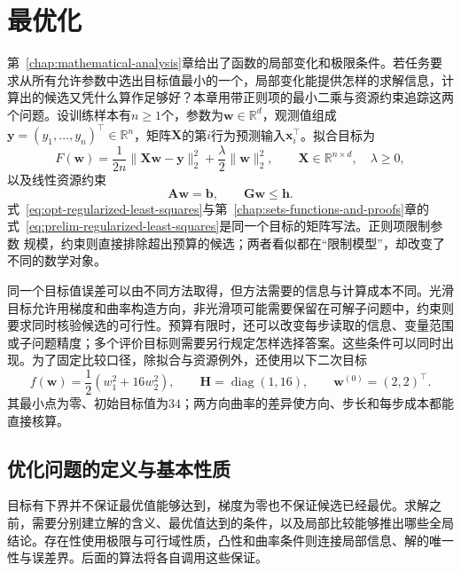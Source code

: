 \chapter{最优化}
\label{chap:optimization}

第~\ref{chap:mathematical-analysis}章给出了函数的局部变化和极限条件。若任务要求从所有允许参数中选出目标值最小的一个，局部变化能提供怎样的求解信息，计算出的候选又凭什么算作足够好？本章用带正则项的最小二乘与资源约束追踪这两个问题。设训练样本有$n\geq1$个，参数为$\bm w\in\mathbb R^d$，观测值组成$\bm y=(y_1,\ldots,y_n)^\top\in\mathbb R^n$，矩阵$\bm X$的第$i$行为预测输入$\bm x_i^\top$。拟合目标为
\begin{equation}
  F(\bm{w})
  =
  \frac{1}{2n}\lVert \bm{X}\bm{w}-\bm{y}\rVert_2^2
  +\frac{\lambda}{2}\lVert\bm{w}\rVert_2^2,
  \qquad
  \bm{X}\in\mathbb{R}^{n\times d},\quad \lambda\geq 0,
  \label{eq:opt-regularized-least-squares}
\end{equation}
以及线性资源约束
\begin{equation}
  \bm{A}\bm{w}=\bm{b},\qquad
  \bm{G}\bm{w}\leq\bm{h}.
  \label{eq:opt-linear-resource-constraints}
\end{equation}
式~\eqref{eq:opt-regularized-least-squares}与第~\ref{chap:sets-functions-and-proofs}章的
式~\eqref{eq:prelim-regularized-least-squares}是同一个目标的矩阵写法。正则项限制参数
规模，约束则直接排除超出预算的候选；两者看似都在“限制模型”，却改变了不同的数学对象。

同一个目标值误差可以由不同方法取得，但方法需要的信息与计算成本不同。光滑目标允许用梯度和曲率构造方向，非光滑项可能需要保留在可解子问题中，约束则要求同时核验候选的可行性。预算有限时，还可以改变每步读取的信息、变量范围或子问题精度；多个评价目标则需要另行规定怎样选择答案。这些条件可以同时出现。为了固定比较口径，除拟合与资源例外，还使用以下二次目标
\begin{equation}
 f(\bm w)=\frac12(w_1^2+16w_2^2),\qquad
 \bm H=\operatorname{diag}(1,16),\qquad
 \bm w^{(0)}=(2,2)^\top.
 \label{eq:opt-common-quadratic}
\end{equation}
其最小点为零、初始目标值为$34$；两方向曲率的差异使方向、步长和每步成本都能直接核算。

\section{优化问题的定义与基本性质}
\label{sec:opt-objectives-solutions-curvature}

目标有下界并不保证最优值能够达到，梯度为零也不保证候选已经最优。求解之前，需要分别建立解的含义、最优值达到的条件，以及局部比较能够推出哪些全局结论。存在性使用极限与可行域性质，凸性和曲率条件则连接局部信息、解的唯一性与误差界。后面的算法将各自调用这些保证。

